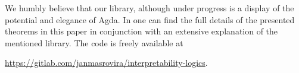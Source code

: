 \documentclass[twoside]{aiml20}
\newcommand{\jan}[1]{\textcolor{orange}{\bf Jan: #1}}
\newcommand{\luka}[1]{\textcolor{blue}{\bf Luka: #1}}
\begin{document}
\begin{itemize}[nosep]
\end{itemize}
We humbly believe that our library, although under progress is
a display of the potential and elegance of Agda. In
\cite{MasRovira:2020:MastersThesis} one can find the full details of the
presented theorems in this paper in conjunction with an extensive explanation of
the mentioned library. The code is freely available at
\begin{center}
\url{https://gitlab.com/janmasrovira/interpretability-logics}.
\end{center}
\end{document}
